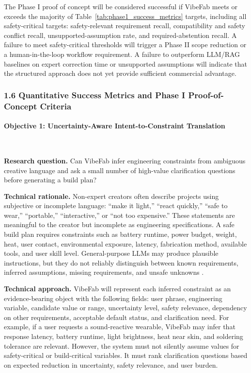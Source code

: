 The Phase I proof of concept will be considered successful if VibeFab meets or exceeds the majority of Table~\ref{tab:phase1_success_metrics} targets, including all safety-critical targets: safety-relevant requirement recall, compatibility and safety conflict recall, unsupported-assumption rate, and required-abstention recall. A failure to meet safety-critical thresholds will trigger a Phase II scope reduction or a human-in-the-loop workflow requirement. A failure to outperform LLM/RAG baselines on expert correction time or unsupported assumptions will indicate that the structured approach does not yet provide sufficient commercial advantage.


\subsubsection*{1.6 Quantitative Success Metrics and Phase I Proof-of-Concept Criteria}
\paragraph{Objective 1: Uncertainty-Aware Intent-to-Constraint Translation}~{}

\textbf{Research question.} Can VibeFab infer engineering constraints from ambiguous creative language and ask a small number of high-value clarification questions before generating a build plan?

\textbf{Technical rationale.} Non-expert creators often describe projects using subjective or incomplete language: ``make it light,'' ``react quickly,'' ``safe to wear,'' ``portable,'' ``interactive,'' or ``not too expensive.'' These statements are meaningful to the creator but incomplete as engineering specifications. A safe build plan requires constraints such as battery runtime, power budget, weight, heat, user contact, environmental exposure, latency, fabrication method, available tools, and user skill level. General-purpose LLMs may produce plausible instructions, but they do not reliably distinguish between known requirements, inferred assumptions, missing requirements, and unsafe unknowns \cite{ji2023hallucination,zhang2023sirens,liu2023trustworthyllms}.

\textbf{Technical approach.} VibeFab will represent each inferred constraint as an evidence-bearing object with the following fields: user phrase, engineering variable, candidate value or range, uncertainty level, safety relevance, dependency on other requirements, acceptable default status, and clarification need. For example, if a user requests a sound-reactive wearable, VibeFab may infer that response latency, battery runtime, light brightness, heat near skin, and soldering tolerance are relevant. However, the system must not silently assume values for safety-critical or build-critical variables. It must rank clarification questions based on expected reduction in uncertainty, safety relevance, and user burden.

